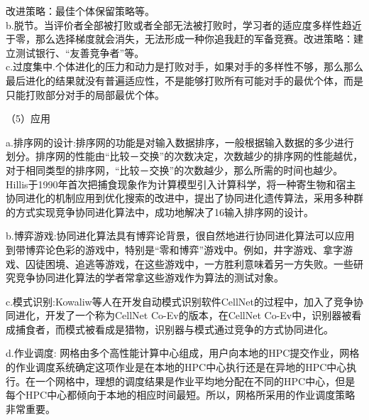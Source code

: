 \documentclass[8pt]{article}
\begin{document}
\begin{description}
改进策略：最佳个体保留策略等。\\
       b.脱节。当评价者全部被打败或者全部无法被打败时，学习者的适应度多样性趋近于零，那么选择梯度就会消失，无法形成一种你追我赶的军备竞赛。改进策略：建立测试银行、“友善竞争者”等。\\
       c.过度集中.个体进化的压力和动力是打败对手，如果对手的多样性不够，那么那么最后进化的结果就没有普遍适应性，不是能够打败所有可能对手的最优个体，而是只能打败部分对手的局部最优个体。\\        
        \item（5）应用\\
        \item a.排序网的设计:排序网的功能是对输入数据排序，一般根据输入数据的多少进行划分。排序网的性能由“比较－交换”的次数决定，次数越少的排序网的性能越优，对于相同类型的排序网，“比较－交换”的次数越少，那么所需的时间也越少。Hillis于1990年首次把捕食现象作为计算模型引入计算科学，将一种寄生物和宿主协同进化的机制应用到优化搜索的改进中，提出了协同进化遗传算法，采用多种群的方式实现竞争协同进化算法中，成功地解决了16输入排序网的设计。        
        \item b.博弈游戏:协同进化算法具有博弈论背景，很自然地进行协同进化算法可以应用到带博弈论色彩的游戏中，特别是“零和博弈”游戏中。例如，井字游戏、拿字游戏、囚徒困境、追逃等游戏，在这些游戏中，一方胜利意味着另一方失败。一些研究竞争协同进化算法的学者常拿这些游戏作为算法的测试对象。              
        \item c.模式识别:Kowaliw等人在开发自动模式识别软件CellNet的过程中，加入了竞争协同进化，开发了一个称为CellNet Co-Ev的版本，在CellNet Co-Ev中，识别器被看成捕食者，而模式被看成是猎物，识别器与模式通过竞争的方式协同进化。        
        \item d.作业调度: 网格由多个高性能计算中心组成，用户向本地的HPC提交作业，网格的作业调度系统确定这项作业是在本地的HPC中心执行还是在异地的HPC中心执行。在一个网格中，理想的调度结果是作业平均地分配在不同的HPC中心，但是每个HPC中心都倾向于本地的相应时间最短。所以，网格所采用的作业调度策略非常重要。        
	\end{description}
\end{document}
